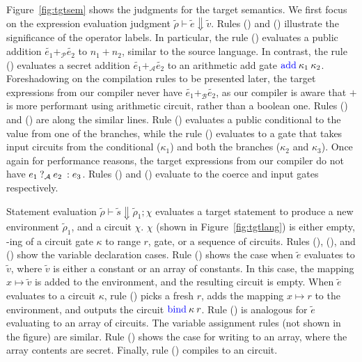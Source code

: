 Figure~\ref{fig:tgtsem} shows the judgments for the target
semantics. We first focus on the expression evaluation judgment
$\widetilde{\rho} \vdash \widetilde{e} \Downarrow
\widetilde{v}$. Rules ({}) and ({}) illustrate
the significance of the operator labels. In particular, the rule
({}) evaluates a public addition $\widetilde{e_{1}}
+_{\mathcal{P}} \widetilde{e_{2}}$ to $n_{1} + n_{2}$, similar to the
source language. In contrast, the rule
({}) evaluates a secret addition $\widetilde{e_{1}}
+_{\mathcal{A}} \widetilde{e_{2}}$ to an arithmetic add
gate $\kw{add}\:\kappa_{1}\:\kappa_{2}$. Foreshadowing on the
compilation rules to be presented later, the target
expressions from our compiler never have $\widetilde{e_{1}}
+_{\mathcal{B}} \widetilde{e_{2}}$, as our compiler is aware that $+$
is more performant using arithmetic circuit, rather than a boolean
one. Rules ({}) and ({})
are along the similar lines. Rule ({}) evaluates a public
conditional to the value from one of the branches, while the rule
({}) evaluates to a  gate that takes input
circuits from the conditional ($\kappa_{1}$) and both the branches
($\kappa_{2}$ and $\kappa_{3}$). Once again for performance reasons,
the target expressions from our compiler do not have
$\lcond{\mathcal{A}}{e_{1}}{e_{2}}{e_{3}}$. Rules
({}) and ({}) evaluate to the coerce and input
gates respectively.

Statement evaluation $\widetilde{\rho} \vdash \widetilde{s} \Downarrow
\widetilde{\rho}_{1}; \chi$ evaluates a target statement to produce a new
environment $\widetilde{\rho}_{1}$, and a circuit $\chi$. $\chi$ (shown
in Figure~\ref{fig:tgtlang}) is either empty, -ing of a
circuit gate $\kappa$ to range $r$,  gate, or a sequence of
circuits. Rules ({}), ({}), and
({}) show the variable declaration cases. Rule
({}) shows the case when $\widetilde{e}$ evaluates to
$\widetilde{v}$, where $\widetilde{v}$ is either a constant or an
array of constants. In this case, the mapping $x \mapsto
\widetilde{v}$ is added to the environment, and the resulting circuit
is empty. When 
$\widetilde{e}$ evaluates to a circuit $\kappa$, rule
({}) picks a fresh $r$, adds the mapping $x \mapsto r$
to the environment, and outputs the circuit
$\kw{bind}\:\kappa\:r$. Rule ({}) is analogous for
$\widetilde{e}$ evaluating to an array of circuits. The variable
assignment rules (not shown in the figure) are similar. Rule
({}) shows the case for writing to an array, where the
array contents are secret. Finally, rule ({}) compiles to an
 circuit.

